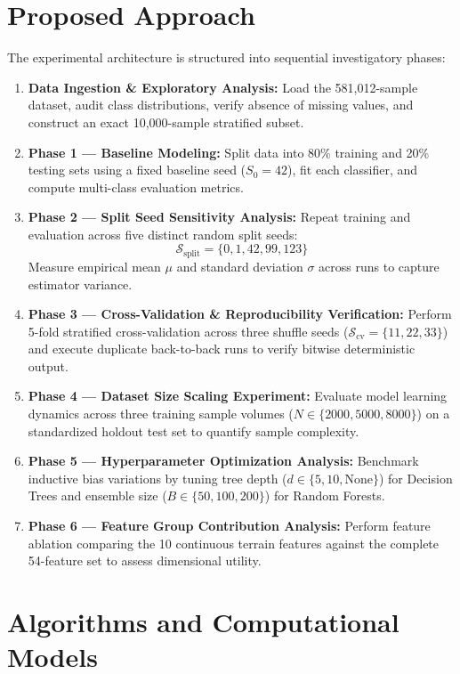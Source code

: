 \section{Proposed Approach}
\label{sec:proposed_approach}

The experimental architecture is structured into sequential investigatory phases:
\begin{enumerate}
    \item \textbf{Data Ingestion \& Exploratory Analysis:} Load the 581,012-sample dataset, audit class distributions, verify absence of missing values, and construct an exact 10,000-sample stratified subset.
    \item \textbf{Phase 1 --- Baseline Modeling:} Split data into 80\% training and 20\% testing sets using a fixed baseline seed ($S_0 = 42$), fit each classifier, and compute multi-class evaluation metrics.
    \item \textbf{Phase 2 --- Split Seed Sensitivity Analysis:} Repeat training and evaluation across five distinct random split seeds:
    \begin{equation}
        \mathcal{S}_{\text{split}} = \{0, 1, 42, 99, 123\}
    \end{equation}
    Measure empirical mean $\mu$ and standard deviation $\sigma$ across runs to capture estimator variance.
    \item \textbf{Phase 3 --- Cross-Validation \& Reproducibility Verification:} Perform 5-fold stratified cross-validation across three shuffle seeds ($\mathcal{S}_{\text{cv}} = \{11, 22, 33\}$) and execute duplicate back-to-back runs to verify bitwise deterministic output.
    \item \textbf{Phase 4 --- Dataset Size Scaling Experiment:} Evaluate model learning dynamics across three training sample volumes ($N \in \{2000, 5000, 8000\}$) on a standardized holdout test set to quantify sample complexity.
    \item \textbf{Phase 5 --- Hyperparameter Optimization Analysis:} Benchmark inductive bias variations by tuning tree depth ($d \in \{5, 10, \text{None}\}$) for Decision Trees and ensemble size ($B \in \{50, 100, 200\}$) for Random Forests.
    \item \textbf{Phase 6 --- Feature Group Contribution Analysis:} Perform feature ablation comparing the 10 continuous terrain features against the complete 54-feature set to assess dimensional utility.
\end{enumerate}

\section{Algorithms and Computational Models}
\label{sec:algorithms}

